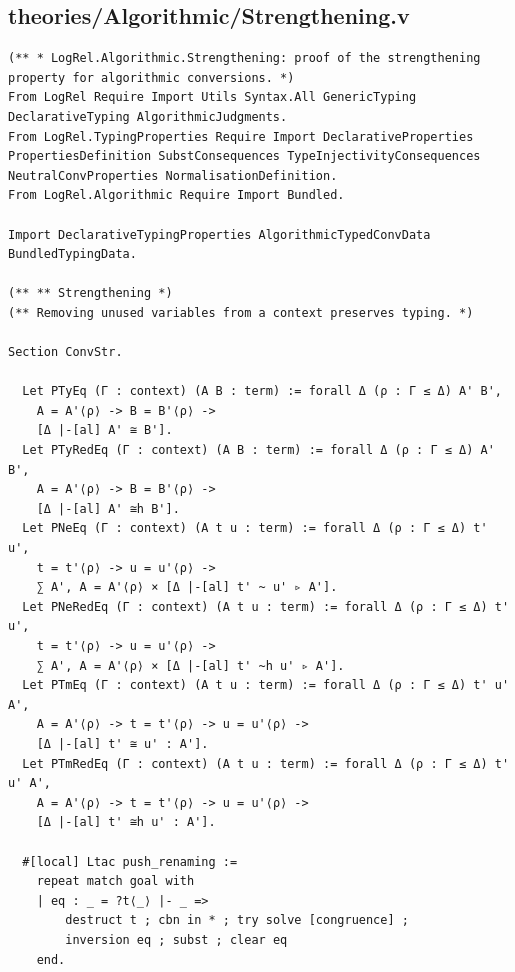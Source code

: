 \documentclass[10pt,a4paper]{amsart}
\begin{document}
\subsection*{theories/Algorithmic/Strengthening.v}
\begin{lstlisting}
(** * LogRel.Algorithmic.Strengthening: proof of the strengthening property for algorithmic conversions. *)
From LogRel Require Import Utils Syntax.All GenericTyping DeclarativeTyping AlgorithmicJudgments.
From LogRel.TypingProperties Require Import DeclarativeProperties PropertiesDefinition SubstConsequences TypeInjectivityConsequences NeutralConvProperties NormalisationDefinition.
From LogRel.Algorithmic Require Import Bundled.

Import DeclarativeTypingProperties AlgorithmicTypedConvData BundledTypingData.

(** ** Strengthening *)
(** Removing unused variables from a context preserves typing. *)

Section ConvStr.
  
  Let PTyEq (Γ : context) (A B : term) := forall Δ (ρ : Γ ≤ Δ) A' B',
    A = A'⟨ρ⟩ -> B = B'⟨ρ⟩ ->
    [Δ |-[al] A' ≅ B'].
  Let PTyRedEq (Γ : context) (A B : term) := forall Δ (ρ : Γ ≤ Δ) A' B',
    A = A'⟨ρ⟩ -> B = B'⟨ρ⟩ ->
    [Δ |-[al] A' ≅h B'].
  Let PNeEq (Γ : context) (A t u : term) := forall Δ (ρ : Γ ≤ Δ) t' u',
    t = t'⟨ρ⟩ -> u = u'⟨ρ⟩ ->
    ∑ A', A = A'⟨ρ⟩ × [Δ |-[al] t' ~ u' ▹ A'].
  Let PNeRedEq (Γ : context) (A t u : term) := forall Δ (ρ : Γ ≤ Δ) t' u',
    t = t'⟨ρ⟩ -> u = u'⟨ρ⟩ ->
    ∑ A', A = A'⟨ρ⟩ × [Δ |-[al] t' ~h u' ▹ A'].
  Let PTmEq (Γ : context) (A t u : term) := forall Δ (ρ : Γ ≤ Δ) t' u' A',
    A = A'⟨ρ⟩ -> t = t'⟨ρ⟩ -> u = u'⟨ρ⟩ ->
    [Δ |-[al] t' ≅ u' : A'].
  Let PTmRedEq (Γ : context) (A t u : term) := forall Δ (ρ : Γ ≤ Δ) t' u' A',
    A = A'⟨ρ⟩ -> t = t'⟨ρ⟩ -> u = u'⟨ρ⟩ ->
    [Δ |-[al] t' ≅h u' : A'].

  #[local] Ltac push_renaming :=
    repeat match goal with
    | eq : _ = ?t⟨_⟩ |- _ =>
        destruct t ; cbn in * ; try solve [congruence] ;
        inversion eq ; subst ; clear eq
    end.


\end{lstlisting}
\end{document}
